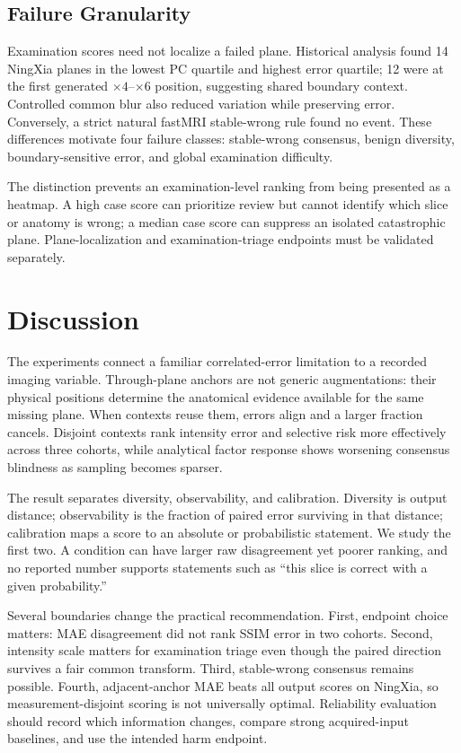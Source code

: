 \documentclass[journal,10pt]{IEEEtran}
\begin{document}
\subsection{Failure Granularity}
Examination scores need not localize a failed plane. Historical analysis found 14 NingXia planes in the lowest PC quartile and highest error quartile; 12 were at the first generated $\times4$--$\times6$ position, suggesting shared boundary context. Controlled common blur also reduced variation while preserving error. Conversely, a strict natural fastMRI stable-wrong rule found no event. These differences motivate four failure classes: stable-wrong consensus, benign diversity, boundary-sensitive error, and global examination difficulty.

The distinction prevents an examination-level ranking from being presented as a heatmap. A high case score can prioritize review but cannot identify which slice or anatomy is wrong; a median case score can suppress an isolated catastrophic plane. Plane-localization and examination-triage endpoints must be validated separately.

\section{Discussion}
The experiments connect a familiar correlated-error limitation to a recorded imaging variable. Through-plane anchors are not generic augmentations: their physical positions determine the anatomical evidence available for the same missing plane. When contexts reuse them, errors align and a larger fraction cancels. Disjoint contexts rank intensity error and selective risk more effectively across three cohorts, while analytical factor response shows worsening consensus blindness as sampling becomes sparser.

The result separates diversity, observability, and calibration. Diversity is output distance; observability is the fraction of paired error surviving in that distance; calibration maps a score to an absolute or probabilistic statement. We study the first two. A condition can have larger raw disagreement yet poorer ranking, and no reported number supports statements such as ``this slice is correct with a given probability.''

Several boundaries change the practical recommendation. First, endpoint choice matters: MAE disagreement did not rank SSIM error in two cohorts. Second, intensity scale matters for examination triage even though the paired direction survives a fair common transform. Third, stable-wrong consensus remains possible. Fourth, adjacent-anchor MAE beats all output scores on NingXia, so measurement-disjoint scoring is not universally optimal. Reliability evaluation should record which information changes, compare strong acquired-input baselines, and use the intended harm endpoint.
\end{document}
